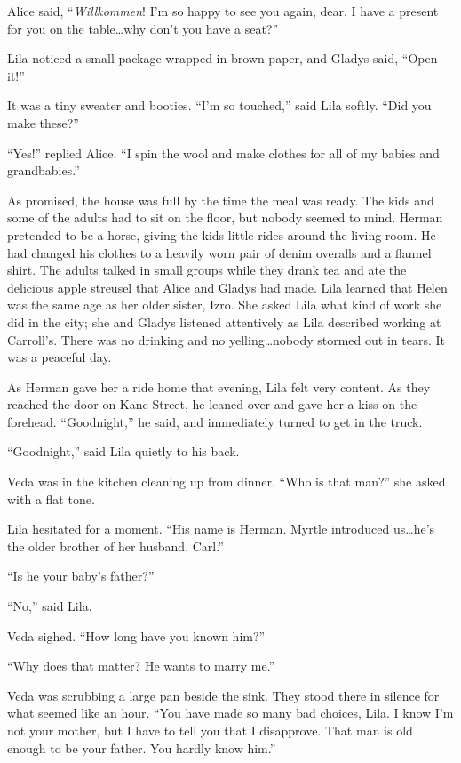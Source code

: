 \documentclass[
  letterpaper,
]{book}
\begin{document}
Alice said, ``\emph{Willkommen}! I'm so happy to see you again, dear. I
have a present for you on the table\ldots why don't you have a seat?''

Lila noticed a small package wrapped in brown paper, and Gladys said,
``Open it!''

It was a tiny sweater and booties. ``I'm so touched,'' said Lila softly.
``Did you make these?''

``Yes!'' replied Alice. ``I spin the wool and make clothes for all of my
babies and grandbabies.''

As promised, the house was full by the time the meal was ready. The kids
and some of the adults had to sit on the floor, but nobody seemed to
mind. Herman pretended to be a horse, giving the kids little rides
around the living room. He had changed his clothes to a heavily worn
pair of denim overalls and a flannel shirt. The adults talked in small
groups while they drank tea and ate the delicious apple streusel that
Alice and Gladys had made. Lila learned that Helen was the same age as
her older sister, Izro. She asked Lila what kind of work she did in the
city; she and Gladys listened attentively as Lila described working at
Carroll's. There was no drinking and no yelling\ldots nobody stormed out
in tears. It was a peaceful day.

As Herman gave her a ride home that evening, Lila felt very content. As
they reached the door on Kane Street, he leaned over and gave her a kiss
on the forehead. ``Goodnight,'' he said, and immediately turned to get
in the truck.

``Goodnight,'' said Lila quietly to his back.

Veda was in the kitchen cleaning up from dinner. ``Who is that man?''
she asked with a flat tone.

Lila hesitated for a moment. ``His name is Herman. Myrtle introduced
us\ldots he's the older brother of her husband, Carl.''

``Is he your baby's father?''

``No,'' said Lila.

Veda sighed. ``How long have you known him?''

``Why does that matter? He wants to marry me.''

Veda was scrubbing a large pan beside the sink. They stood there in
silence for what seemed like an hour. ``You have made so many bad
choices, Lila. I know I'm not your mother, but I have to tell you that I
disapprove. That man is old enough to be your father. You hardly know
him.''
\end{document}
